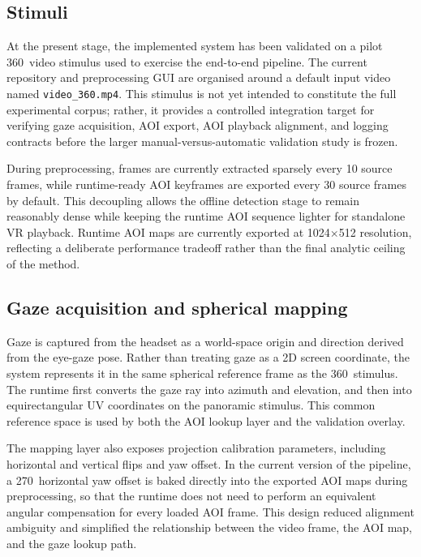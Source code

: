 \documentclass[11pt]{article}
\begin{document}
\subsection{Stimuli}
At the present stage, the implemented system has been validated on a pilot 360\textdegree\ video stimulus used to exercise the end-to-end pipeline. The current repository and preprocessing GUI are organised around a default input video named \texttt{video\_360.mp4}. This stimulus is not yet intended to constitute the full experimental corpus; rather, it provides a controlled integration target for verifying gaze acquisition, AOI export, AOI playback alignment, and logging contracts before the larger manual-versus-automatic validation study is frozen.

During preprocessing, frames are currently extracted sparsely every 10 source frames, while runtime-ready AOI keyframes are exported every 30 source frames by default. This decoupling allows the offline detection stage to remain reasonably dense while keeping the runtime AOI sequence lighter for standalone VR playback. Runtime AOI maps are currently exported at 1024$\times$512 resolution, reflecting a deliberate performance tradeoff rather than the final analytic ceiling of the method.

\subsection{Gaze acquisition and spherical mapping}
Gaze is captured from the headset as a world-space origin and direction derived from the eye-gaze pose. Rather than treating gaze as a 2D screen coordinate, the system represents it in the same spherical reference frame as the 360\textdegree\ stimulus. The runtime first converts the gaze ray into azimuth and elevation, and then into equirectangular UV coordinates on the panoramic stimulus. This common reference space is used by both the AOI lookup layer and the validation overlay.

The mapping layer also exposes projection calibration parameters, including horizontal and vertical flips and yaw offset. In the current version of the pipeline, a 270\textdegree\ horizontal yaw offset is baked directly into the exported AOI maps during preprocessing, so that the runtime does not need to perform an equivalent angular compensation for every loaded AOI frame. This design reduced alignment ambiguity and simplified the relationship between the video frame, the AOI map, and the gaze lookup path.
\end{document}

